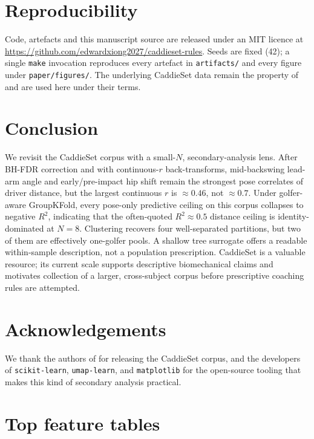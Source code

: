 \documentclass[11pt,a4paper]{article}
\begin{document}
\section{Reproducibility}

Code, artefacts and this manuscript source are released under an MIT licence at
\url{https://github.com/edwardxiong2027/caddieset-rules}.  Seeds are fixed (42); a single \texttt{make}
invocation reproduces every artefact in \texttt{artifacts/} and every figure under \texttt{paper/figures/}.
The underlying CaddieSet data remain the property of \citet{jung2025caddieset} and are used here under their
terms.

\section{Conclusion}

We revisit the CaddieSet corpus with a small-$N$, secondary-analysis lens.  After BH-FDR correction and with
continuous-$r$ back-transforms, mid-backswing lead-arm angle and early/pre-impact hip shift remain the strongest
pose correlates of driver distance, but the largest continuous $r$ is $\approx 0.46$, not $\approx 0.7$.  Under
golfer-aware GroupKFold, every pose-only predictive ceiling on this corpus collapses to negative $R^2$,
indicating that the often-quoted $R^2\approx 0.5$ distance ceiling is identity-dominated at $N=8$.  Clustering
recovers four well-separated partitions, but two of them are effectively one-golfer pools.  A shallow tree
surrogate offers a readable within-sample description, not a population prescription.  CaddieSet is a valuable
resource; its current scale supports descriptive biomechanical claims and motivates collection of a larger,
cross-subject corpus before prescriptive coaching rules are attempted.

\section*{Acknowledgements}
We thank the authors of \citet{jung2025caddieset} for releasing the CaddieSet corpus, and the developers of
\texttt{scikit-learn}, \texttt{umap-learn}, and \texttt{matplotlib} for the open-source tooling that makes this
kind of secondary analysis practical.




\appendix
\section{Top feature tables}
\label{app:tables}
\end{document}
